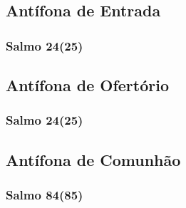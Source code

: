 \subsection{Antífona de Entrada}
\nopagebreak


\subsubsection{Salmo 24(25)}
\nopagebreak


\subsection{Antífona de Ofertório}
\nopagebreak


\subsubsection{Salmo 24(25)}
\nopagebreak


\subsection{Antífona de Comunhão}
\nopagebreak


\subsubsection{Salmo 84(85)}
\nopagebreak
